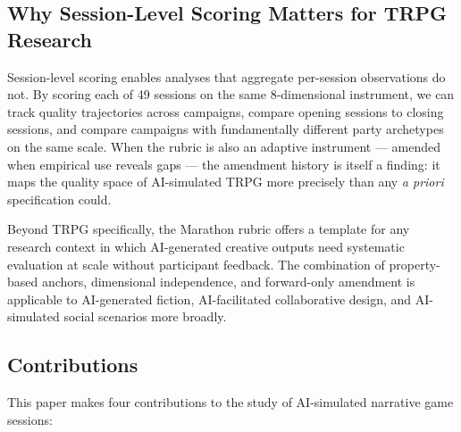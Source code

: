 \subsection{Why Session-Level Scoring Matters for TRPG Research}

Session-level scoring enables analyses that aggregate per-session observations do not.
By scoring each of 49 sessions on the same 8-dimensional instrument, we can track
quality trajectories across campaigns, compare opening sessions to closing sessions,
and compare campaigns with fundamentally different party archetypes on the same scale.
When the rubric is also an adaptive instrument --- amended when empirical use reveals
gaps --- the amendment history is itself a finding: it maps the quality space of
AI-simulated TRPG more precisely than any \textit{a priori} specification could.

Beyond TRPG specifically, the Marathon rubric offers a template for any research
context in which AI-generated creative outputs need systematic evaluation at scale
without participant feedback. The combination of property-based anchors, dimensional
independence, and forward-only amendment is applicable to AI-generated fiction,
AI-facilitated collaborative design, and AI-simulated social scenarios more broadly.

\subsection{Contributions}

This paper makes four contributions to the study of AI-simulated narrative game sessions:

